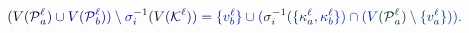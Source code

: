 \documentclass[12pt]{article}
\begin{document}
\makeatletter
\renewcommand*{\@textcolor}[3]{%
  \protect\leavevmode
  \begingroup
    \color#1{#2}#3%
  \endgroup
}
\makeatother
\begin{displaymath}
\mathcolor[RGB]{0,0,15}{(} \mathcolor[RGB]{0,0,30}{V} \mathcolor[RGB]{0,0,45}{(} \mathcal { \mathcolor[RGB]{0,0,60}{P} } _ { \mathcolor[RGB]{0,0,75}{a} } ^ { \mathcolor[RGB]{0,0,90}{\ell} } \mathcolor[RGB]{0,0,105}{)} \mathcolor[RGB]{0,0,120}{\cup} \mathcolor[RGB]{0,0,135}{V} \mathcolor[RGB]{0,0,150}{(} \mathcal { \mathcolor[RGB]{0,0,165}{P} } _ { \mathcolor[RGB]{0,0,180}{b} } ^ { \mathcolor[RGB]{0,0,195}{\ell} } \mathcolor[RGB]{0,0,210}{)} \mathcolor[RGB]{0,0,225}{)} \mathcolor[RGB]{0,0,240}{\setminus} \mathcolor[RGB]{0,0,255}{\sigma} _ { \mathcolor[RGB]{0,15,0}{i} } ^ { \mathcolor[RGB]{0,15,15}{-} \mathcolor[RGB]{0,15,30}{1} } \mathcolor[RGB]{0,15,45}{(} \mathcolor[RGB]{0,15,60}{V} \mathcolor[RGB]{0,15,75}{(} \mathcal { \mathcolor[RGB]{0,15,90}{K} } ^ { \mathcolor[RGB]{0,15,105}{\ell} } \mathcolor[RGB]{0,15,120}{)} \mathcolor[RGB]{0,15,135}{)} \mathcolor[RGB]{0,15,150}{=} \mathcolor[RGB]{0,15,165}{\{} \mathcolor[RGB]{0,15,180}{v} _ { \mathcolor[RGB]{0,15,195}{b} } ^ { \mathcolor[RGB]{0,15,210}{\ell} } \mathcolor[RGB]{0,15,225}{\}} \mathcolor[RGB]{0,15,240}{\cup} \mathcolor[RGB]{0,15,255}{(} \mathcolor[RGB]{0,30,0}{\sigma} _ { \mathcolor[RGB]{0,30,15}{i} } ^ { \mathcolor[RGB]{0,30,30}{-} \mathcolor[RGB]{0,30,45}{1} } \mathcolor[RGB]{0,30,60}{(} \mathcolor[RGB]{0,30,75}{\{} \mathcolor[RGB]{0,30,90}{\kappa} _ { \mathcolor[RGB]{0,30,105}{a} } ^ { \mathcolor[RGB]{0,30,120}{\ell} } \mathcolor[RGB]{0,30,135}{,} \mathcolor[RGB]{0,30,150}{\kappa} _ { \mathcolor[RGB]{0,30,165}{b} } ^ { \mathcolor[RGB]{0,30,180}{\ell} } \mathcolor[RGB]{0,30,195}{\}} \mathcolor[RGB]{0,30,210}{)} \mathcolor[RGB]{0,30,225}{\cap} \mathcolor[RGB]{0,30,240}{(} \mathcolor[RGB]{0,30,255}{V} \mathcolor[RGB]{0,45,0}{(} \mathcal { \mathcolor[RGB]{0,45,15}{P} } _ { \mathcolor[RGB]{0,45,30}{a} } ^ { \mathcolor[RGB]{0,45,45}{\ell} } \mathcolor[RGB]{0,45,60}{)} \mathcolor[RGB]{0,45,75}{\setminus} \mathcolor[RGB]{0,45,90}{\{} \mathcolor[RGB]{0,45,105}{v} _ { \mathcolor[RGB]{0,45,120}{a} } ^ { \mathcolor[RGB]{0,45,135}{\ell} } \mathcolor[RGB]{0,45,150}{\}} \mathcolor[RGB]{0,45,165}{)} \mathcolor[RGB]{0,45,180}{)} \mathcolor[RGB]{0,45,195}{.}
\end{displaymath}
\end{document}
